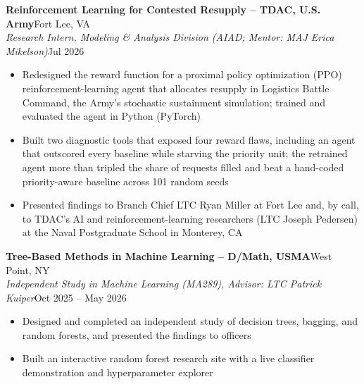 \documentclass[10pt,letterpaper]{article}
\newcommand{\entry}[4]{%
  \needspace{3\baselineskip}%
  \textbf{#1}\hfill #2\\
  \textit{#3}\hfill #4\par}
\begin{document}
\entry{Reinforcement Learning for Contested Resupply -- TDAC, U.S. Army}{Fort Lee, VA}{Research Intern, Modeling \& Analysis Division (AIAD; Mentor: MAJ Erica Mikelson)}{Jul 2026}
\begin{itemize}
  \item Redesigned the reward function for a proximal policy optimization (PPO) reinforcement-learning agent that allocates resupply in Logistics Battle Command, the Army's stochastic sustainment simulation; trained and evaluated the agent in Python (PyTorch)
  \item Built two diagnostic tools that exposed four reward flaws, including an agent that outscored every baseline while starving the priority unit; the retrained agent more than tripled the share of requests filled and beat a hand-coded priority-aware baseline across 101 random seeds
  \item Presented findings to Branch Chief LTC Ryan Miller at Fort Lee and, by call, to TDAC's AI and reinforcement-learning researchers (LTC Joseph Pedersen) at the Naval Postgraduate School in Monterey, CA
\end{itemize}

\entry{Tree-Based Methods in Machine Learning -- D/Math, USMA}{West Point, NY}{Independent Study in Machine Learning (MA289), Advisor: LTC Patrick Kuiper}{Oct 2025 -- May 2026}
\begin{itemize}
  \item Designed and completed an independent study of decision trees, bagging, and random forests, and presented the findings to officers
  \item Built an interactive random forest research site with a live classifier demonstration and hyperparameter explorer
\end{itemize}

\end{document}

